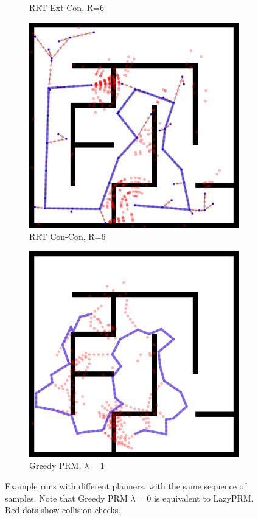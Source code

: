 \begin{figure}
\begin{subfigure}[b]{0.3\textwidth}
\caption{RRT Ext-Con, R=6}
\end{subfigure}%
\quad
\begin{subfigure}[b]{0.3\textwidth}
\includegraphics[width=\textwidth]{figs/compare-2d-rrtc1-rrtconcon-r6-s1.png}
\caption{RRT Con-Con, R=6}
\end{subfigure}%
\quad
\begin{subfigure}[b]{0.3\textwidth}
\includegraphics[width=\textwidth]{figs/compare-2d-rrtc1-checkmask-l10-s1.png}
\caption{Greedy PRM, $\lambda=1$}
\end{subfigure}%
\caption{Example runs with different planners,
   with the same sequence of samples.
   Note that Greedy PRM $\lambda=0$ is equivalent to LazyPRM.
   Red dots show collision checks.}
\label{fig:compare-2d-rrtc1-vis}
\end{figure}

